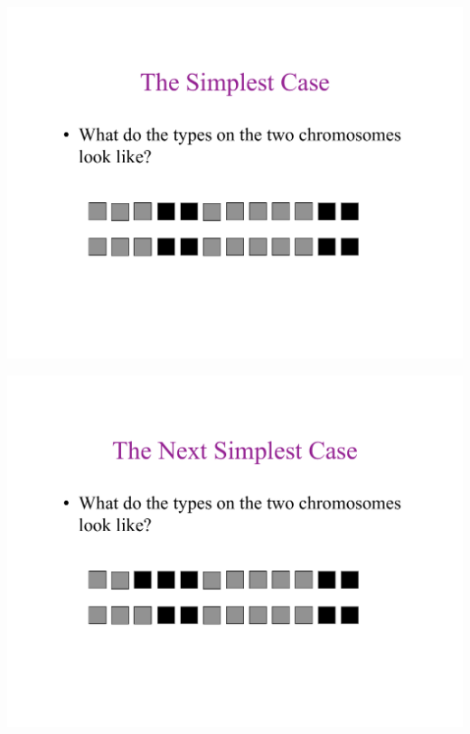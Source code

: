 \newslide{}
\mbox{}
\vspace*{\VertUp}
\enlargethispage*{1000pt}
\begin{center}
\includegraphics*[width=\textwidth]{PPT_pages/pg_0011.pdf}
\end{center}


\newslide{}
\mbox{}
\vspace*{\VertUp}
\enlargethispage*{1000pt}
\begin{center}
\includegraphics*[width=\textwidth]{PPT_pages/pg_0012.pdf}
\end{center}


